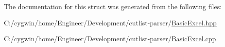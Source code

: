 The documentation for this struct was generated from the following files\+:\begin{DoxyCompactItemize}
\item 
C\+:/cygwin/home/\+Engineer/\+Development/cutlist-\/parser/\hyperlink{_basic_excel_8hpp}{Basic\+Excel.\+hpp}\item 
C\+:/cygwin/home/\+Engineer/\+Development/cutlist-\/parser/\hyperlink{_basic_excel_8cpp}{Basic\+Excel.\+cpp}\end{DoxyCompactItemize}
